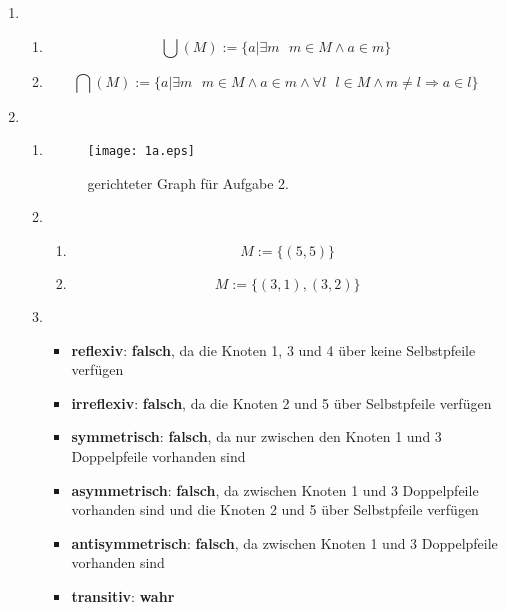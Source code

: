 \documentclass[a4paper]{article}
\begin{document}
	\begin{enumerate}
		\item
		\begin{enumerate}
			\item
			\begin{equation*}
				\bigcup(M) := \{ a | \exists m \text{ } m \in M \land a \in m \}
			\end{equation*}
			
			\item
			\begin{equation*}
				\bigcap(M) := \{ a | \exists m \text{ } m \in M \land a \in m \land \forall l \text{ } l \in M \land m \neq l  \Rightarrow a \in l \}
			\end{equation*}
		\end{enumerate}
		
		\item
		\begin{enumerate}
			\item
			\begin{figure}[ht!]
				\begin{center}
					\texttt{[image: 1a.eps]}
					\caption{gerichteter Graph für Aufgabe 2.}
				\end{center}
			\end{figure}
			
			\item
			\begin{enumerate}
				\item
				\begin{equation*}
					M := \{ (5, 5) \}
				\end{equation*}
				
				\item
				\begin{equation*}
					M := \{ (3, 1), (3, 2) \}
				\end{equation*}
			\end{enumerate}
			
			\item
			\begin{itemize}
				\item \textbf{reflexiv}: \textbf{falsch}, da die Knoten 1, 3 und 4 über keine Selbstpfeile verfügen
				\item \textbf{irreflexiv}: \textbf{falsch}, da die Knoten 2 und 5 über Selbstpfeile verfügen
				\item \textbf{symmetrisch}: \textbf{falsch}, da nur zwischen den Knoten 1 und 3 Doppelpfeile vorhanden sind
				\item \textbf{asymmetrisch}: \textbf{falsch}, da zwischen Knoten 1 und 3 Doppelpfeile vorhanden sind und die Knoten 2 und 5 über Selbstpfeile verfügen
				\item \textbf{antisymmetrisch}: \textbf{falsch}, da zwischen Knoten 1 und 3 Doppelpfeile vorhanden sind
				\item \textbf{transitiv}: \textbf{wahr}
			\end{itemize}
		\end{enumerate}
		

\end{enumerate}
\end{document}
